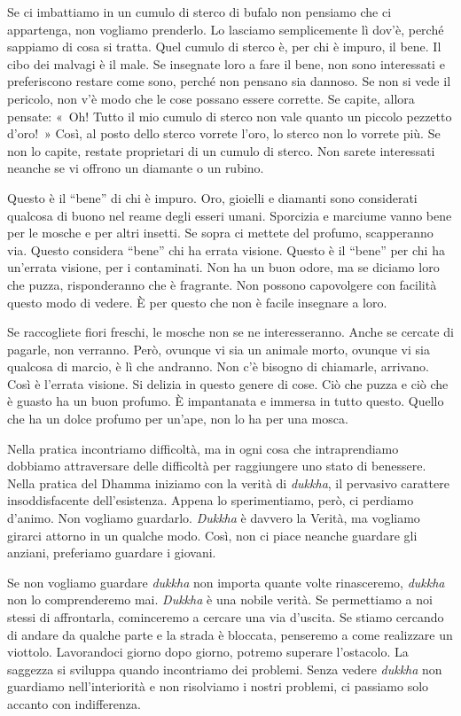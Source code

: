 Se ci imbattiamo in un cumulo di sterco di bufalo non pensiamo che ci
appartenga, non vogliamo prenderlo. Lo lasciamo semplicemente lì dov'è,
perché sappiamo di cosa si tratta. Quel cumulo di sterco è, per chi è
impuro, il bene. Il cibo dei malvagi è il male. Se insegnate loro a fare
il bene, non sono interessati e preferiscono restare come sono, perché
non pensano sia dannoso. Se non si vede il pericolo, non v'è modo che le
cose possano essere corrette. Se capite, allora pensate: «~Oh! Tutto il
mio cumulo di sterco non vale quanto un piccolo pezzetto d'oro!~» Così,
al posto dello sterco vorrete l'oro, lo sterco non lo vorrete più. Se
non lo capite, restate proprietari di un cumulo di sterco. Non sarete
interessati neanche se vi offrono un diamante o un rubino.

Questo è il ``bene'' di chi è impuro. Oro, gioielli e diamanti sono
considerati qualcosa di buono nel reame degli esseri umani. Sporcizia e
marciume vanno bene per le mosche e per altri insetti. Se sopra ci
mettete del profumo, scapperanno via. Questo considera ``bene'' chi ha
errata visione. Questo è il ``bene'' per chi ha un'errata visione, per i
contaminati. Non ha un buon odore, ma se diciamo loro che puzza,
risponderanno che è fragrante. Non possono capovolgere con facilità
questo modo di vedere. È per questo che non è facile insegnare a loro.

Se raccogliete fiori freschi, le mosche non se ne interesseranno. Anche
se cercate di pagarle, non verranno. Però, ovunque vi sia un animale
morto, ovunque vi sia qualcosa di marcio, è lì che andranno. Non c'è
bisogno di chiamarle, arrivano. Così è l'errata visione. Si delizia in
questo genere di cose. Ciò che puzza e ciò che è guasto ha un buon
profumo. È impantanata e immersa in tutto questo. Quello che ha un dolce
profumo per un'ape, non lo ha per una mosca.

Nella pratica incontriamo difficoltà, ma in ogni cosa che intraprendiamo
dobbiamo attraversare delle difficoltà per raggiungere uno stato di
benessere. Nella pratica del Dhamma iniziamo con la verità di
\emph{dukkha}, il pervasivo carattere insoddisfacente dell'esistenza.
Appena lo sperimentiamo, però, ci perdiamo d'animo. Non vogliamo
guardarlo. \emph{Dukkha} è davvero la Verità, ma vogliamo girarci
attorno in un qualche modo. Così, non ci piace neanche guardare gli
anziani, preferiamo guardare i giovani.

Se non vogliamo guardare \emph{dukkha} non importa quante volte
rinasceremo, \emph{dukkha} non lo comprenderemo mai. \emph{Dukkha} è una
nobile verità. Se permettiamo a noi stessi di affrontarla, cominceremo a
cercare una via d'uscita. Se stiamo cercando di andare da qualche parte
e la strada è bloccata, penseremo a come realizzare un viottolo.
Lavorandoci giorno dopo giorno, potremo superare l'ostacolo. La saggezza
si sviluppa quando incontriamo dei problemi. Senza vedere \emph{dukkha}
non guardiamo nell'interiorità e non risolviamo i nostri problemi, ci
passiamo solo accanto con indifferenza.

